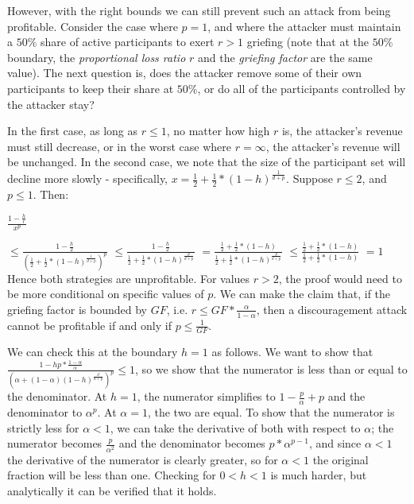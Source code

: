 \documentclass[12pt]{article}
\begin{document}
However, with the right bounds we can still prevent such an attack from being profitable. Consider the case where $p=1$, and where the attacker must maintain a $50\%$ share of active participants to exert $r > 1$ griefing (note that at the $50\%$ boundary, the \textit{proportional loss ratio} $r$ and the \textit{griefing factor} are the same value). The next question is, does the attacker remove some of their own participants to keep their share at $50\%$, or do all of the participants controlled by the attacker stay?

In the first case, as long as $r \le 1$, no matter how high $r$ is, the attacker's revenue must still decrease, or in the worst case where $r = \infty$, the attacker's revenue will be unchanged. In the second case, we note that the size of the participant set will decline more slowly - specifically, $x = \frac{1}{2} + \frac{1}{2} * (1-h)^{\frac{1}{d+p}}$. Suppose $r \le 2$, and $p \le 1$. Then:

$\frac{1-\frac{h}{r}}{x^p}$


$ \le \frac{1-\frac{h}{2}}{(\frac{1}{2} + \frac{1}{2} * (1-h)^{\frac{1}{d+p}})^p}$
$ \le \frac{1-\frac{h}{2}}{\frac{1}{2} + \frac{1}{2} * (1-h)^{\frac{p}{d+p}}}$
$ = \frac{\frac{1}{2} + \frac{1}{2} * (1-h)}{\frac{1}{2} + \frac{1}{2} * (1-h)^{\frac{p}{d+p}}}$
$ \le \frac{\frac{1}{2} + \frac{1}{2} * (1-h)}{\frac{1}{2} + \frac{1}{2} * (1-h)}$
$ = 1$
Hence both strategies are unprofitable. For values $r > 2$, the proof would need to be more conditional on specific values of $p$. We can make the claim that, if the griefing factor is bounded by $GF$, i.e. $r \le GF * \frac{\alpha}{1-\alpha}$, then a discouragement attack cannot be profitable if and only if $p \le \frac{1}{GF}$.

We can check this at the boundary $h = 1$ as follows. We want to show that $\frac{1 - hp * \frac{1-\alpha}{\alpha}}{(\alpha + (1-\alpha)(1-h)^{\frac{d}{d+p}})^p} \le 1$, so we show that the numerator is less than or equal to the denominator. At $h = 1$, the numerator simplifies to $1 - \frac{p}{\alpha} + p$ and the denominator to $\alpha^p$. At $\alpha=1$, the two are equal. To show that the numerator is strictly less for $\alpha<1$, we can take the derivative of both with respect to $\alpha$; the numerator becomes $\frac{p}{\alpha^2}$ and the denominator becomes $p * \alpha^{p-1}$, and since $\alpha < 1$ the derivative of the numerator is clearly greater, so for $\alpha < 1$ the original fraction will be less than one. Checking for $0 < h < 1$ is much harder, but analytically it can be verified that it holds.
\end{document}
